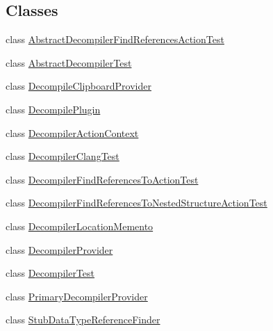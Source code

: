 \subsection*{Classes}
\begin{DoxyCompactItemize}
\item 
class \mbox{\hyperlink{classghidra_1_1app_1_1plugin_1_1core_1_1decompile_1_1_abstract_decompiler_find_references_action_test}{Abstract\+Decompiler\+Find\+References\+Action\+Test}}
\item 
class \mbox{\hyperlink{classghidra_1_1app_1_1plugin_1_1core_1_1decompile_1_1_abstract_decompiler_test}{Abstract\+Decompiler\+Test}}
\item 
class \mbox{\hyperlink{classghidra_1_1app_1_1plugin_1_1core_1_1decompile_1_1_decompile_clipboard_provider}{Decompile\+Clipboard\+Provider}}
\item 
class \mbox{\hyperlink{classghidra_1_1app_1_1plugin_1_1core_1_1decompile_1_1_decompile_plugin}{Decompile\+Plugin}}
\item 
class \mbox{\hyperlink{classghidra_1_1app_1_1plugin_1_1core_1_1decompile_1_1_decompiler_action_context}{Decompiler\+Action\+Context}}
\item 
class \mbox{\hyperlink{classghidra_1_1app_1_1plugin_1_1core_1_1decompile_1_1_decompiler_clang_test}{Decompiler\+Clang\+Test}}
\item 
class \mbox{\hyperlink{classghidra_1_1app_1_1plugin_1_1core_1_1decompile_1_1_decompiler_find_references_to_action_test}{Decompiler\+Find\+References\+To\+Action\+Test}}
\item 
class \mbox{\hyperlink{classghidra_1_1app_1_1plugin_1_1core_1_1decompile_1_1_decompiler_find_references_to_nested_structure_action_test}{Decompiler\+Find\+References\+To\+Nested\+Structure\+Action\+Test}}
\item 
class \mbox{\hyperlink{classghidra_1_1app_1_1plugin_1_1core_1_1decompile_1_1_decompiler_location_memento}{Decompiler\+Location\+Memento}}
\item 
class \mbox{\hyperlink{classghidra_1_1app_1_1plugin_1_1core_1_1decompile_1_1_decompiler_provider}{Decompiler\+Provider}}
\item 
class \mbox{\hyperlink{classghidra_1_1app_1_1plugin_1_1core_1_1decompile_1_1_decompiler_test}{Decompiler\+Test}}
\item 
class \mbox{\hyperlink{classghidra_1_1app_1_1plugin_1_1core_1_1decompile_1_1_primary_decompiler_provider}{Primary\+Decompiler\+Provider}}
\item 
class \mbox{\hyperlink{classghidra_1_1app_1_1plugin_1_1core_1_1decompile_1_1_stub_data_type_reference_finder}{Stub\+Data\+Type\+Reference\+Finder}}
\end{DoxyCompactItemize}
